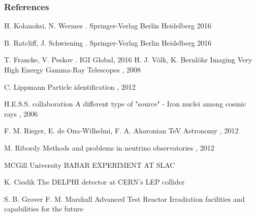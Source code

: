 \documentclass[aspectratio=1610, 10pt]{beamer}
\begin{document}
\begin{frame}[allowframebreaks]
        \frametitle{References}
        
     \begin{thebibliography}{10}
        \beamertemplatebookbibitems
          H. Kolanoksi, N. Wermes
          .
          \newblock  Springer-Verlag Berlin Heidelberg 2016

          B. Ratcliff, J. Schwiening
          .
          \newblock  Springer-Verlag Berlin Heidelberg 2016

          T. Francke, V. Peskov
          .
          \newblock  IGI Global, 2016
          \beamertemplatearticlebibitems
            H. J. Völk, K. Bernlöhr
            \newblock Imaging Very High Energy Gamma-Ray Telescopes
            , 2008

            C. Lippmann
            \newblock Particle identification
            , 2012

             H.E.S.S. collaboration
            \newblock A different type of "source" - Iron nuclei among cosmic rays
            , 2006

             F. M. Rieger, E. de Ona-Wilhelmi, F. A. Aharonian
            \newblock TeV Astronomy
            , 2012

             M. Ribordy
            \newblock Methods and problems in neutrino observatories
            , 2012

            MCGill University
            \newblock  BABAR EXPERIMENT AT SLAC

            K. Cieslik
            \newblock  The DELPHI detector at CERN's LEP collider

            S. B. Grover F. M. Marshall
            \newblock  Advanced Test Reactor Irradiation facilities and capabilities for the future


\end{thebibliography}
\end{frame}
\end{document}
